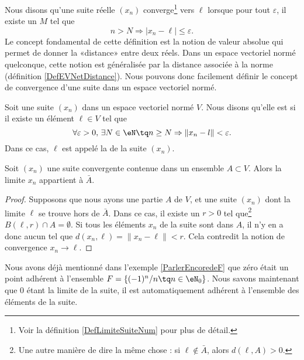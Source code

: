 Nous disons qu'une suite réelle $(x_n)$ converge\footnote{Voir la définition \ref{DefLimiteSuiteNum} pour plus de détail.} vers $\ell$ lorsque pour tout $\varepsilon$, il existe un $M$ tel que
\begin{equation}
	n>N\Rightarrow | x_n-\ell |\leq\varepsilon.
\end{equation}
Le concept fondamental de cette définition est la notion de valeur absolue qui permet de donner la «distance» entre deux réels. Dans un espace vectoriel normé quelconque, cette notion est généralisée par la distance associée à la norme (définition \ref{DefEVNetDistance}). Nous pouvons donc facilement définir le concept de convergence d'une suite dans un espace vectoriel normé.

\begin{definition}		\label{DefCvSuiteEGVN}
	Soit une suite $(x_n)$ dans un espace vectoriel normé $V$. Nous disons qu'elle est  si il existe un élément $\ell\in V$ tel que
	\begin{equation}
		\forall \varepsilon>0,\,\exists N\in\eN\tq n\geq N\Rightarrow \| x_n-l \|<\varepsilon.
	\end{equation}
	Dans ce cas, $\ell$ est appelé la  de la suite $(x_n)$.
\end{definition}


\begin{lemma}		\label{LemLimAbarA}
	Soit $(x_n)$ une suite convergente contenue dans un ensemble $A\subset V$. Alors la limite $x_n$ appartient à $\bar A$.
\end{lemma}

\begin{proof}
	Supposons que nous ayons une partie $A$ de $V$, et une suite $(x_n)$ dont la limite $\ell$ se trouve hors de $\bar A$. Dans ce cas, il existe un $r>0$ tel que\footnote{Une autre manière de dire la même chose : si $\ell\notin\bar A$, alors $d(\ell,A)>0$.} $B(\ell,r)\cap A=\emptyset$. Si tous les éléments $x_n$ de la suite sont dans $A$, il n'y en a donc aucun tel que $d(x_n,\ell)=\| x_n-\ell \|<r$. Cela contredit la notion de convergence $x_n\to \ell$.
\end{proof}

Nous avons déjà mentionné dans l'exemple \ref{ParlerEncoredeF} que zéro était un point adhérent à l'ensemble $F=\{ (-1)^n/n\tq n\in\eN_0 \}$. Nous savons maintenant que $0$ étant la limite de la suite, il est automatiquement adhérent à l'ensemble des éléments de la suite.

